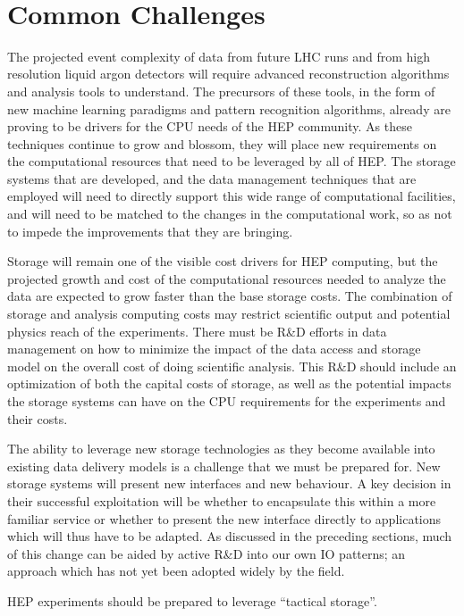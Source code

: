\documentclass[12pt,a4paper]{article}
\begin{document}
~

\section{Common Challenges}\label{common-challenges}

The projected event complexity of data from future LHC runs and from
high resolution liquid argon detectors will require advanced
reconstruction algorithms and analysis tools to understand. The
precursors of these tools, in the form of new machine learning paradigms
and pattern recognition algorithms, already are proving to be drivers
for the CPU needs of the HEP community. As these techniques continue to
grow and blossom, they will place new requirements on the computational
resources that need to be leveraged by all of HEP. The storage systems
that are developed, and the data management techniques that are employed
will need to directly support this wide range of computational
facilities, and will need to be matched to the changes in the
computational work, so as not to impede the improvements that they are
bringing.

Storage will remain one of the visible cost drivers for HEP computing,
but the projected growth and cost of the computational resources needed
to analyze the data are expected to grow faster than the base storage
costs. The combination of storage and analysis computing costs may
restrict scientific output and potential physics reach of the
experiments. There must be R\&D efforts in data management on how to
minimize the impact of the data access and storage model on the overall
cost of doing scientific analysis. This R\&D should include an
optimization of both the capital costs of storage, as well as the
potential impacts the storage systems can have on the CPU requirements
for the experiments and their costs.

The ability to leverage new storage technologies as they become
available into existing data delivery models is a challenge that we must
be prepared for. New storage systems will present new interfaces and new
behaviour. A key decision in their successful exploitation will be
whether to encapsulate this within a more familiar service or whether to
present the new interface directly to applications which will thus have
to be adapted. As discussed in the preceding sections, much of this
change can be aided by active R\&D into our own IO patterns; an approach
which has not yet been adopted widely by the field.

HEP experiments should be prepared to leverage ``tactical storage''.
\end{document}
